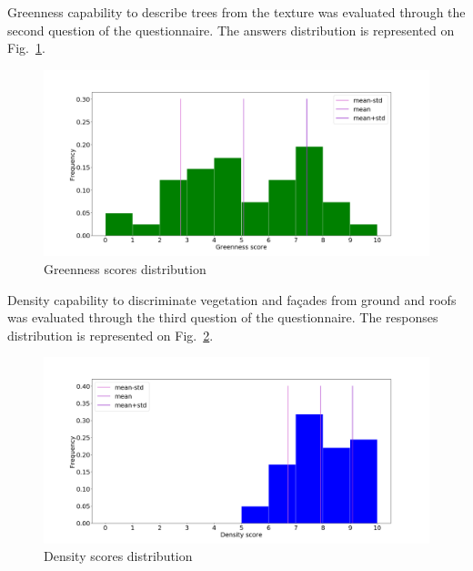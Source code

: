 \documentclass{kththesis}
\begin{document}
Greenness capability to describe trees from the texture was evaluated through the second question of the questionnaire. The answers distribution is represented on Fig.~\ref{fig:greenness_survey}.

\begin{figure}[H]
\includegraphics[width=\textwidth]{images/Results/MRF_survey/hist_green.png} 
\caption{Greenness scores distribution} 
\label{fig:greenness_survey}
\end{figure}

%
%
Density capability to discriminate vegetation and façades from ground and roofs was evaluated through the third question of the questionnaire. The responses distribution is represented on Fig.~\ref{fig:density_survey}. 
\begin{figure}[H]
\includegraphics[width=\textwidth]{images/Results/MRF_survey/hist_dens.png} 
\caption{Density scores distribution} 
\label{fig:density_survey}
\end{figure}

\end{document}
